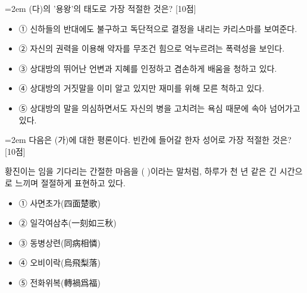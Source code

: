 \documentclass[11pt,a4paper]{article}
\newcommand{\qnum}[1]{%
  \tikz[baseline=(num.base)]{%
    \node[circle, fill=numCircle, text=white, inner sep=0pt,
          minimum size=18pt, font=\small\bfseries] (num) {#1};%
  }%
}
\newcommand{\pts}[1]{%
  \hfill\textcolor{ptsBadge}{[#1점]}%
}
\begin{document}
\vspace{4mm}
\begin{minipage}{\columnwidth}
{\hangindent=2em
\qnum{39}\enspace (다)의 '용왕'의 태도로 가장 적절한 것은? \pts{10}
\par}

\vspace{3mm}
\begin{itemize}[leftmargin=2.5em, labelsep=0.3em, label={}, itemsep=4pt, parsep=1pt, topsep=0pt]
  \item ① 신하들의 반대에도 불구하고 독단적으로 결정을 내리는 카리스마를 보여준다.
  \item ② 자신의 권력을 이용해 약자를 무조건 힘으로 억누르려는 폭력성을 보인다.
  \item ③ 상대방의 뛰어난 언변과 지혜를 인정하고 겸손하게 배움을 청하고 있다.
  \item ④ 상대방의 거짓말을 이미 알고 있지만 재미를 위해 모른 척하고 있다.
  \item ⑤ 상대방의 말을 의심하면서도 자신의 병을 고치려는 욕심 때문에 속아 넘어가고 있다.
\end{itemize}
\end{minipage}
\vspace{4mm}

\vspace{4mm}
\begin{minipage}{\columnwidth}
{\hangindent=2em
\qnum{40}\enspace 다음은 (가)에 대한 평론이다. 빈칸에 들어갈 한자 성어로 가장 적절한 것은? \pts{10}
\par}

\vspace{3mm}
\begin{tcolorbox}[bogi]
황진이는 임을 기다리는 간절한 마음을 (          )이라는 말처럼, 하루가 천 년 같은 긴 시간으로 느끼며 절절하게 표현하고 있다.
\end{tcolorbox}
\vspace{3mm}
\begin{itemize}[leftmargin=2.5em, labelsep=0.3em, label={}, itemsep=4pt, parsep=1pt, topsep=0pt]
  \item ① 사면초가(四面楚歌)
  \item ② 일각여삼추(一刻如三秋)
  \item ③ 동병상련(同病相憐)
  \item ④ 오비이락(烏飛梨落)
  \item ⑤ 전화위복(轉禍爲福)
\end{itemize}
\end{minipage}
\vspace{4mm}
\end{document}
